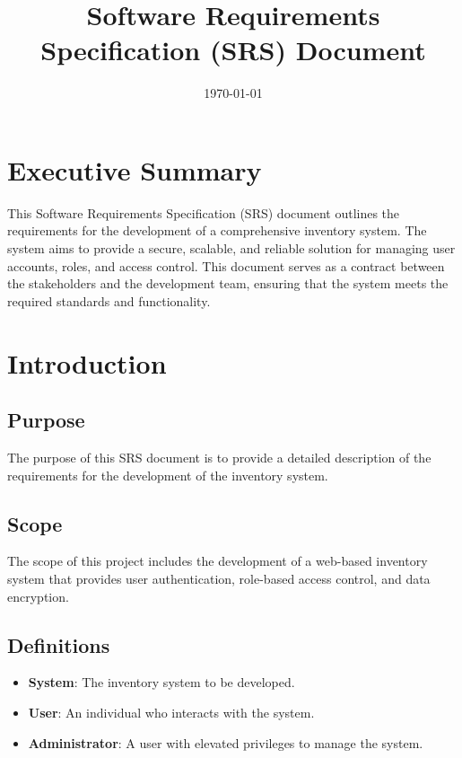 \documentclass{article}
\begin{document}
\title{Software Requirements Specification (SRS) Document}
\author{}
\date{\today}

\maketitle

\tableofcontents

\section{Executive Summary}
This Software Requirements Specification (SRS) document outlines the requirements for the development of a comprehensive inventory system. The system aims to provide a secure, scalable, and reliable solution for managing user accounts, roles, and access control. This document serves as a contract between the stakeholders and the development team, ensuring that the system meets the required standards and functionality.

\section{Introduction}
\subsection{Purpose}
The purpose of this SRS document is to provide a detailed description of the requirements for the development of the inventory system.

\subsection{Scope}
The scope of this project includes the development of a web-based inventory system that provides user authentication, role-based access control, and data encryption.

\subsection{Definitions}
\begin{itemize}
\item \textbf{System}: The inventory system to be developed.
\item \textbf{User}: An individual who interacts with the system.
\item \textbf{Administrator}: A user with elevated privileges to manage the system.
\end{itemize}
\end{document}
